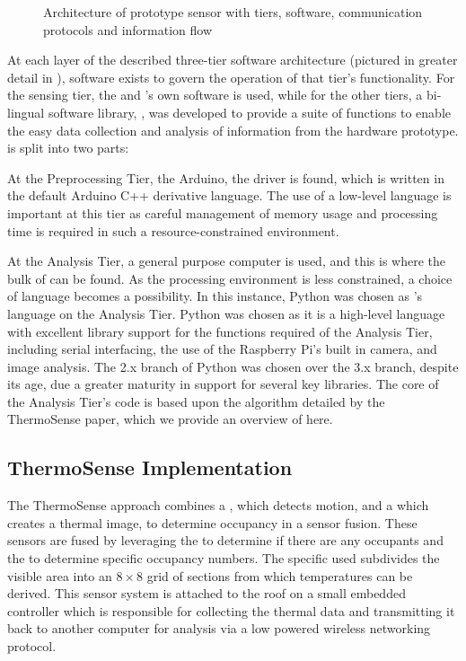 \documentclass[../thesis/thesis.tex]{subfiles}
\begin{document}
\begin{figure}
\centering

\caption{Architecture of prototype sensor with tiers, software, communication protocols and information flow}
\label{fig:pictures:protob-arch}
\end{figure}

At each layer of the described three-tier software architecture (pictured in greater detail in ), software exists to govern the operation of that tier's functionality. For the sensing tier, the \mlx and \pir's own software is used, while for the other tiers, a bi-lingual software library, \tarl, was developed to provide a suite of functions to enable the easy data collection and analysis of information from the hardware prototype. \tarl is split into two parts:

At the Preprocessing Tier, the Arduino, the \tarl \mlx driver is found, which is written in the default Arduino C++ derivative language. The use of a low-level language is important at this tier as careful management of memory usage and processing time is required in such a resource-constrained environment.

At the Analysis Tier, a general purpose computer is used, and this is where the bulk of \tarl can be found. As the processing environment is less constrained, a choice of language becomes a possibility. In this instance, Python was chosen as \tarl's language on the Analysis Tier. Python was chosen as it is a high-level language with excellent library support for the functions required of the Analysis Tier, including serial interfacing, the use of the Raspberry Pi's built in camera, and image analysis. The 2.x branch of Python was chosen over the 3.x branch, despite its age, due a greater maturity in support for several key libraries. The core of the Analysis Tier's code is based upon the algorithm detailed by the ThermoSense paper, which we provide an overview of here.

\subsection{ThermoSense Implementation}
\label{subsec:thermosenseimplementation}
The ThermoSense \cite{beltran2013thermosense} approach combines a \pir, which detects motion, and a \iar which creates a thermal image, to determine occupancy in a sensor fusion. These sensors are fused by leveraging the \pir to determine if there are any occupants and the \iar to determine specific occupancy numbers. The specific \iar used subdivides the visible area into an $8\times8$ grid of sections from which temperatures can be derived. This sensor system is attached to the roof on a small embedded controller which is responsible for collecting the thermal data and transmitting it back to another computer for analysis via a low powered wireless networking protocol. 
\end{document}
